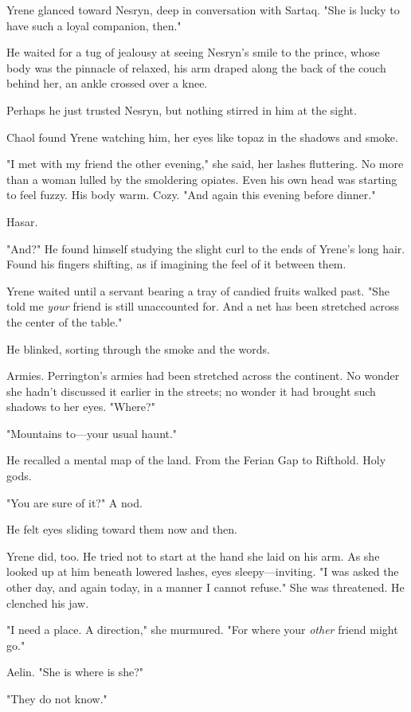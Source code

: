Yrene glanced toward Nesryn, deep in conversation with Sartaq. "She is lucky to have such a loyal companion, then."

He waited for a tug of jealousy at seeing Nesryn's smile to the prince, whose body was the pinnacle of relaxed, his arm draped along the back of the couch behind her, an ankle crossed over a knee.

Perhaps he just trusted Nesryn, but nothing stirred in him at the sight.

Chaol found Yrene watching him, her eyes like topaz in the shadows and smoke.

"I met with my friend the other evening," she said, her lashes fluttering. No more than a woman lulled by the smoldering opiates. Even his own head was starting to feel fuzzy. His body warm. Cozy. "And again this evening before dinner."

Hasar.

"And?" He found himself studying the slight curl to the ends of Yrene's long hair. Found his fingers shifting, as if imagining the feel of it between them.

Yrene waited until a servant bearing a tray of candied fruits walked past. "She told me \emph{your} friend is still unaccounted for. And a net has been stretched across the center of the table."

He blinked, sorting through the smoke and the words.

Armies. Perrington's armies had been stretched across the continent. No wonder she hadn't discussed it earlier in the streets; no wonder it had brought such shadows to her eyes. "Where?"

"Mountains to---your usual haunt."

He recalled a mental map of the land. From the Ferian Gap to Rifthold. Holy gods.

"You are sure of it?" A nod.

He felt eyes sliding toward them now and then.

Yrene did, too. He tried not to start at the hand she laid on his arm. As she looked up at him beneath lowered lashes, eyes sleepy---inviting. "I was asked the other day, and again today, in a manner I cannot refuse." She was threatened. He clenched his jaw.

"I need a place. A direction," she murmured. "For where your
\emph{other} friend might go."

Aelin. "She is  where is she?"

"They do not know."

